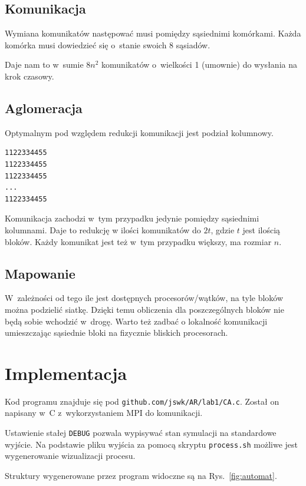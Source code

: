 \documentclass[a4paper; 12pt]{article}
\begin{document}
\subsection{Komunikacja}
Wymiana komunikatów następować musi pomiędzy sąsiednimi komórkami.
Każda komórka musi dowiedzieć się o~stanie swoich 8 sąsiadów.

Daje nam to w~sumie $8 n^2$ komunikatów o~wielkości 1 (umownie) do wysłania na
krok czasowy.

\subsection{Aglomeracja}
Optymalnym pod względem redukcji komunikacji jest podział kolumnowy.
\begin{lstlisting}[basicstyle=\ttfamily]
1122334455
1122334455
1122334455
...       
1122334455
\end{lstlisting}
Komunikacja zachodzi w~tym przypadku jedynie pomiędzy sąsiednimi kolumnami.
Daje to redukcję w ilości komunikatów do $2t$, gdzie $t$ jest ilością bloków. 
Każdy komunikat jest też w~tym przypadku większy, ma rozmiar $n$.

\subsection{Mapowanie}
W~zależności od tego ile jest dostępnych procesorów/wątków, na tyle bloków
można podzielić siatkę. 
Dzięki temu obliczenia dla poszczególnych bloków nie będą sobie wchodzić
w~drogę.
Warto też zadbać o lokalność komunikacji umieszczając sąsiednie bloki na
fizycznie bliskich procesorach.

\section{Implementacja}

Kod programu znajduje się pod \texttt{github.com/jswk/AR/lab1/CA.c}.
Został on napisany w~C z~wykorzystaniem MPI do komunikacji.

Ustawienie stałej \texttt{DEBUG} pozwala wypisywać stan symulacji na
standardowe wyjście.
Na podstawie pliku wyjścia za pomocą skryptu \texttt{process.sh} możliwe jest
wygenerowanie wizualizacji procesu.

Struktury wygenerowane przez program widoczne są na Rys.~\ref{fig:automat}.
\end{document}
